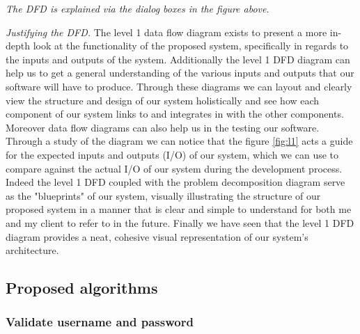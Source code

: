 \textit{The DFD is explained via the dialog boxes in 
the figure above}.\\ \vspace{0.2cm}

\textit{Justifying the DFD.} The level 1 data flow diagram 
exists to present a more in-depth look at the functionality of
the proposed system, specifically in regards to the inputs and 
outputs of the system. Additionally the level 1 DFD diagram can help 
us to get a general understanding of the various inputs and 
outputs that our software will have to produce. Through these
diagrams we can layout and clearly view the structure and
design of our system holistically and see how each component
of our system links to and integrates in with the other components.
Moreover data flow diagrams can also help us in the testing our 
software. Through a study of the diagram we can notice that the
figure \ref{fig:l1} acts a guide for the expected inputs and
outputs (I/O) of our system, which we can use to compare against
the actual I/O of our system during the development process.
Indeed the level 1 DFD coupled with the problem decomposition 
diagram serve as the "blueprints" of our system, visually 
illustrating the structure of our proposed system in a manner 
that is clear and simple to understand for both me and my client 
to refer to in the future.
Finally we have seen that the level 1 DFD diagram provides a
neat, cohesive visual representation of our system's architecture.

\subsection{\textsf Proposed algorithms}



\subsubsection{Validate username and password}

